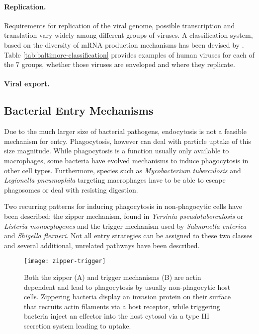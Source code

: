\paragraph{Replication.}
Requirements for replication of the viral genome, possible transcription and translation vary widely among different groups of viruses. A classification system, based on the diversity of mRNA production mechanisms has been devised by \cite{Baltimore1971}. Table \ref{tab:baltimore-classification} provides examples of human viruses for each of the 7 groups, whether those viruses are enveloped and where they replicate.

\paragraph{Viral export.}

\subsection{Bacterial Entry Mechanisms}

Due to the much larger size of bacterial pathogens, endocytosis is not a feasible mechanism for entry. Phagocytosis, however can deal with particle uptake of this size magnitude. While phagocytosis is a function usually only available to macrophages, some bacteria have evolved mechanisms to induce phagocytosis in other cell types. Furthermore, species such as \textit{Mycobacterium tuberculosis} and \textit{Legionella pneumophila} targeting macrophages have to be able to escape phagosomes or deal with resisting digestion.

Two recurring patterns for inducing phagocytosis in non-phagocytic cells have been described: the zipper mechanism, found in \textit{Yersinia pseudotuberculosis} or \textit{Listeria monocytogenes} and the trigger mechanism used by \textit{Salmonella enterica} and \textit{Shigella flexneri}. Not all entry strategies can be assigned to these two classes and several additional, unrelated pathways have been described.

\begin{figure}
  \centering
  \texttt{[image: zipper-trigger]}
  \caption[Zipper and trigger mechanisms for bacterial host-cell entry]{Both the zipper (A) and trigger mechanisms (B) are actin dependent and lead to phagocytosis by usually non-phagocytic host cells. Zippering bacteria display an invasion protein on their surface that recruits actin filaments via a host receptor, while triggering bacteria inject an effector into the host cytosol via a type III secretion system leading to uptake. \citep{Haglund2011}}
  \label{fig:zipper-trigger}
\end{figure}

